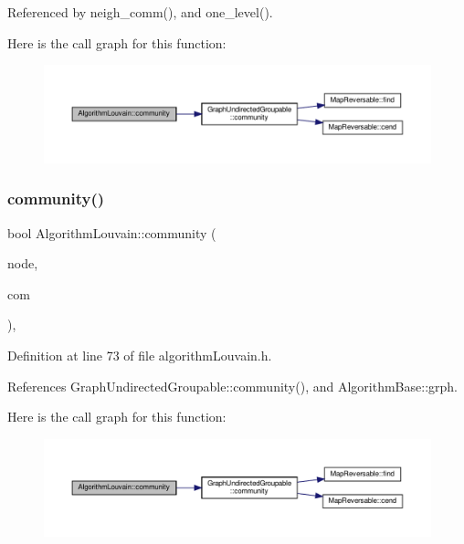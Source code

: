Referenced by neigh\+\_\+comm(), and one\+\_\+level().

Here is the call graph for this function\+:
\nopagebreak
\begin{figure}[H]
\begin{center}
\leavevmode
\includegraphics[width=350pt]{classAlgorithmLouvain_a5f59777e27ab7a3e5accbc1f52b0e51e_cgraph}
\end{center}
\end{figure}
\mbox{\label{classAlgorithmLouvain_a12549c842a87a6f9380ee8226ac58cf8}} 
\subsubsection{\texorpdfstring{community()}{community()}\hspace{0.1cm}{\footnotesize\ttfamily [2/2]}}
{\footnotesize\ttfamily bool Algorithm\+Louvain\+::community (\begin{DoxyParamCaption}\item[{const \hyperlink{edge_8h_a5fbd20c46956d479cb10afc9855223f6}{type\+Vertex} \&}]{node,  }\item[{const \hyperlink{graphUndirectedGroupable_8h_a914da95c9ea7f14f4b7f875c36818556}{type\+Community} \&}]{com }\end{DoxyParamCaption})\hspace{0.3cm}{\ttfamily [inline]}, {\ttfamily [private]}}



Definition at line 73 of file algorithm\+Louvain.\+h.



References Graph\+Undirected\+Groupable\+::community(), and Algorithm\+Base\+::grph.

Here is the call graph for this function\+:
\nopagebreak
\begin{figure}[H]
\begin{center}
\leavevmode
\includegraphics[width=350pt]{classAlgorithmLouvain_a12549c842a87a6f9380ee8226ac58cf8_cgraph}
\end{center}
\end{figure}
\mbox{\label{classAlgorithmLouvain_a8a8af8c837dd1a24a6be7904121edbbd}} 
